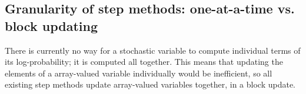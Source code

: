 % 
% 
% 
% 

\subsection{Granularity of step methods: one-at-a-time vs. block updating} 
\label{subsec:granularity}
There is currently no way for a stochastic variable to compute individual terms of its log-probability; it is computed all together. This means that updating the elements of a array-valued variable individually would be inefficient, so all existing step methods update array-valued variables together, in a block update.

